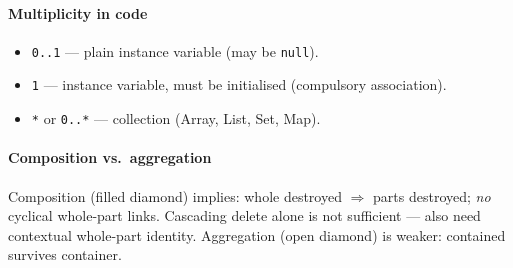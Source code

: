 \paragraph{Multiplicity in code}
\begin{itemize}
  \item \texttt{0..1} — plain instance variable (may be \texttt{null}).
  \item \texttt{1} — instance variable, must be initialised (compulsory association).
  \item \texttt{*} or \texttt{0..*} — collection (Array, List, Set, Map).
\end{itemize}

\paragraph{Composition vs.\ aggregation}
\textcolor{Bittersweet}{Composition} (filled diamond) implies: whole destroyed $\Rightarrow$ parts destroyed; \emph{no} cyclical whole-part links. \textcolor{Bittersweet}{Cascading delete alone is not sufficient} — also need contextual whole-part identity. \textcolor{Bittersweet}{Aggregation} (open diamond) is weaker: contained survives container.
